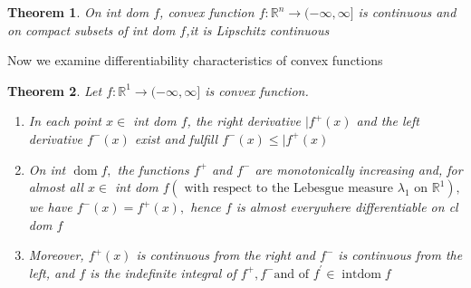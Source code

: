 \documentclass[oneside]{book}
\newtheorem{theorem}{Theorem}[section]
\newtheorem{mydef}{Definition}[section]
\begin{document}
	\begin{theorem}	
		\label{t:7.5}
		On int dom $f$, convex function $f: \mathbb{R}^{n} \rightarrow(-\infty, \infty]$ is continuous and on compact subsets of int dom $f$,it is Lipschitz continuous 	
		
	\end{theorem}	
	
	Now we examine differentiability characteristics of convex functions	
	\begin{theorem}	
		\label{t:7.9}
		Let $f: \mathbb{R}^{1} \rightarrow(-\infty, \infty]$ is convex function.	
		\begin{enumerate}	
			\item 	
			In each point $x \in$ int dom $f$, the right derivative $| f^{+}(x)$ and the left derivative $f^{-}(x)$ exist and fulfill $f^{-}(x) \leq | f^{+}(x)$	
			\\	
			\item	
			On int $\operatorname{dom} f,$ the functions $f^{+}$ and $f^{-}$ are monotonically increasing and, for almost all	
			$x \in$ int dom $f\left(\text { with respect to the Lebesgue measure } \lambda_{1} \text { on } \mathbb{R}^{1}\right),$ we have $f^{-}(x)=f^{+}(x),$ hence $f$ is almost everywhere differentiable on cl dom $f$	
			\\	
			\item	
			Moreover, $f^{+}(x)$	
			is continuous from the right and $f^{-}$ is continuous from the left, and $f$ is the indefinite integral of $ f^{+}, f^{-} \text {and of } f^{\prime} \in \operatorname{int dom} f$
		\end{enumerate}	
		
		
		
		
		
		
	\end{theorem}
	
	
	
	
	
	
	
	

\end{document}
